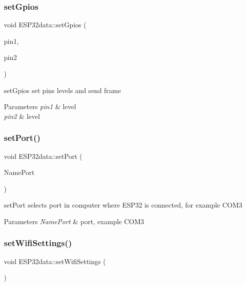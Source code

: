 \subsubsection{\texorpdfstring{set\+Gpios}{setGpios}}
{\footnotesize\ttfamily void E\+S\+P32data\+::set\+Gpios (\begin{DoxyParamCaption}\item[{int}]{pin1,  }\item[{int}]{pin2 }\end{DoxyParamCaption})\hspace{0.3cm}{\ttfamily [slot]}}



set\+Gpios set pins levels and send frame 


\begin{DoxyParams}{Parameters}
{\em pin1} & level \\
\hline
{\em pin2} & level \\
\hline
\end{DoxyParams}
\mbox{\label{class_e_s_p32data_a6681c1880617d85c2dfe2dac976aa021}} 
\subsubsection{\texorpdfstring{set\+Port()}{setPort()}}
{\footnotesize\ttfamily void E\+S\+P32data\+::set\+Port (\begin{DoxyParamCaption}\item[{Q\+String}]{Name\+Port }\end{DoxyParamCaption})}



set\+Port selects port in computer where E\+S\+P32 is connected, for example C\+O\+M3 


\begin{DoxyParams}{Parameters}
{\em Name\+Port} & port, example C\+O\+M3 \\
\hline
\end{DoxyParams}
\mbox{\label{class_e_s_p32data_ac4d3568c735d68b89cc5c7d59ccce8e7}} 
\subsubsection{\texorpdfstring{set\+Wifi\+Settings()}{setWifiSettings()}}
{\footnotesize\ttfamily void E\+S\+P32data\+::set\+Wifi\+Settings (\begin{DoxyParamCaption}{ }\end{DoxyParamCaption})}



